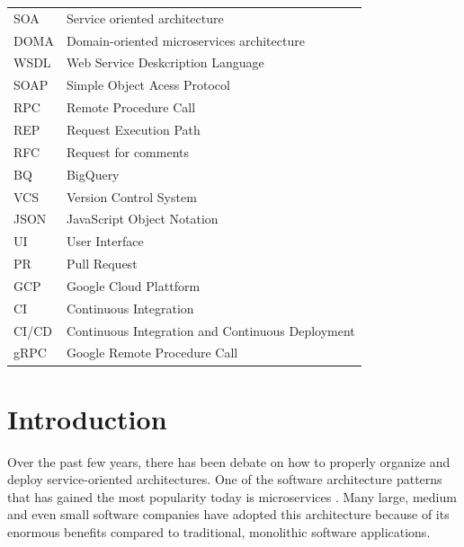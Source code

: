 \documentclass[english, 12pt, a4paper, sci, utf8, a-1b, online]{aaltothesis}
\begin{document}
\begin{tabular}{ll}
SOA          & Service oriented architecture \\
DOMA         & Domain-oriented microservices architecture \\
WSDL         & Web Service Deskcription Language \\
SOAP         & Simple Object Acess Protocol \\
RPC          & Remote Procedure Call \\
REP          & Request Execution Path \\
RFC          & Request for comments \\
BQ           & BigQuery \\
VCS          & Version Control System\\
JSON         & JavaScript Object Notation\\
UI           & User Interface\\
PR           & Pull Request\\
GCP          & Google Cloud Plattform\\
CI           & Continuous Integration\\
CI/CD        & Continuous Integration and Continuous Deployment\\
gRPC         & Google Remote Procedure Call\\

\end{tabular}


\cleardoublepage


\section{Introduction}


Over the past few years, there has been debate on how to properly organize and deploy service-oriented architectures. One of the software architecture patterns that has gained the most popularity today is microservices \cite{MicroservicesAdoption}. Many large, medium and even small software companies have adopted this architecture because of its enormous benefits compared to traditional, monolithic software applications.\\
\end{document}
